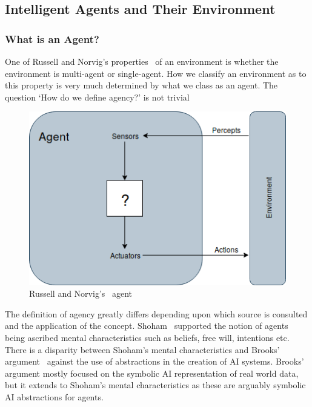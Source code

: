\documentclass[]{final_report}
\begin{document}
\subsection{Intelligent Agents and Their Environment}
\subsubsection{What is an Agent?}
One of Russell and Norvig's properties~\cite{russell2016artificial} of an environment is whether the environment is multi-agent or single-agent. How we classify an environment as to this property is very much determined by what we class as an agent. The question `How do we define agency?' is not trivial\par 
\begin{figure}
\vspace{-20pt}
\begin{framed}
	\center
	\includegraphics[width=\textwidth]{russellnorvigagent.png}
	\caption{Russell and Norvig's~\cite{russell2016artificial} agent}
	\label{fig:rnagent}
\end{framed}
\vspace{-20pt}
\end{figure}
The definition of agency greatly differs depending upon which source is consulted and the application of the concept. Shoham~\cite{shoham1993agent} supported the notion of agents being ascribed mental characteristics such as beliefs, free will, intentions etc. There is a disparity between Shoham's mental characteristics and Brooks' argument~\cite{brooks1991intelligence} against the use of abstractions in the creation of AI systems. Brooks' argument mostly focused on the symbolic AI representation of real world data, but it extends to Shoham's mental characteristics as these are arguably symbolic AI abstractions for agents.\par 
\end{document}
